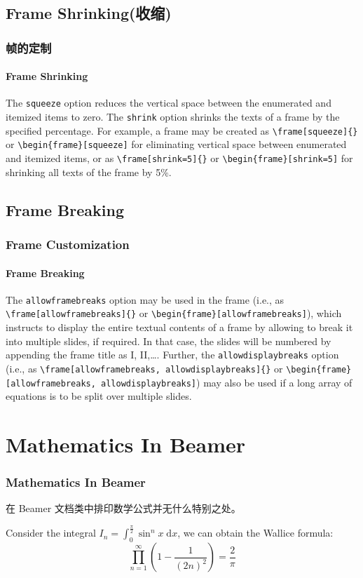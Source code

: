 \documentclass{beamer}
\begin{document}
\subsection{Frame Shrinking(收缩)}
\begin{frame}[containsverbatim]
\frametitle{帧的定制}
\framesubtitle{Frame Shrinking}
The \verb|squeeze| option reduces the vertical space between the enumerated and itemized items to zero. The \verb|shrink| option shrinks the texts of a frame by the specified percentage. For example, a frame may be created as \verb|\frame[squeeze]{}| or
\verb|\begin{frame}[squeeze]| for eliminating vertical space between enumerated and itemized items, or as \verb|\frame[shrink=5]{}| or \verb|\begin{frame}[shrink=5]| for shrinking all texts of the frame by 5$\%$.
\end{frame}

\subsection{Frame Breaking}
\begin{frame}[containsverbatim]
\frametitle{Frame Customization}
\framesubtitle{Frame Breaking}
The \verb|allowframebreaks| option may be used in the frame (i.e., as \verb|\frame[allowframebreaks]{}| or \verb|\begin{frame}[allowframebreaks]|), which instructs to display the entire textual contents of a frame by allowing to break it into multiple slides, if required. In that case, the slides will be numbered by appending the frame title as I, II,…. Further, the \verb|allowdisplaybreaks| option (i.e., as \verb|\frame[allowframebreaks, allowdisplaybreaks]{}| or \verb|\begin{frame}[allowframebreaks, allowdisplaybreaks]|) may also be used if a long array of equations is to be split over multiple slides.
\end{frame}

\section{Mathematics In Beamer}
\begin{frame}[allowframebreaks]
\frametitle{Mathematics In Beamer}
在 Beamer 文档类中排印数学公式并无什么特别之处。
\begin{theorem}[Wallice公式]
Consider the integral $\displaystyle I_n=\int_0^{\frac{\pi}{2}}\sin^nx\;\mathrm{d}x$, we can obtain the Wallice formula:
\[\prod_{n=1}^{\infty}\left(1-\frac{1}{(2n)^2}\right)=\frac{2}{\pi}\]
\end{theorem}
\end{frame}
\end{document}
